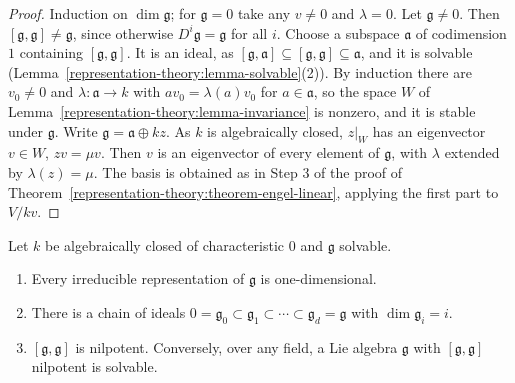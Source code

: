\begin{proof}
Induction on $\dim\mathfrak{g}$; for $\mathfrak{g} = 0$ take any $v \neq 0$ and $\lambda = 0$. Let $\mathfrak{g} \neq 0$. Then $[\mathfrak{g}, \mathfrak{g}] \neq \mathfrak{g}$,
since otherwise $D^i\mathfrak{g} = \mathfrak{g}$ for all $i$. Choose a subspace $\mathfrak{a}$ of codimension $1$ containing $[\mathfrak{g}, \mathfrak{g}]$. It is an ideal,
as $[\mathfrak{g}, \mathfrak{a}] \subseteq [\mathfrak{g}, \mathfrak{g}] \subseteq \mathfrak{a}$, and it is solvable (Lemma~\ref{representation-theory:lemma-solvable}(2)). By
induction there are $v_0 \neq 0$ and $\lambda \colon \mathfrak{a} \to k$ with $av_0 = \lambda(a)v_0$ for $a \in \mathfrak{a}$, so the space $W$ of
Lemma~\ref{representation-theory:lemma-invariance} is nonzero, and it is stable under $\mathfrak{g}$. Write $\mathfrak{g} = \mathfrak{a} \oplus kz$. As $k$ is algebraically
closed, $z|_W$ has an eigenvector $v \in W$, $zv = \mu v$. Then $v$ is an eigenvector of every element of $\mathfrak{g}$, with $\lambda$ extended by $\lambda(z) = \mu$.
The basis is obtained as in Step 3 of the proof of Theorem~\ref{representation-theory:theorem-engel-linear}, applying the first part to $V/kv$.
\end{proof}

\begin{corollary}\label{representation-theory:corollary-lie}
Let $k$ be algebraically closed of characteristic $0$ and $\mathfrak{g}$ solvable.
\begin{enumerate}
\item Every irreducible representation of $\mathfrak{g}$ is one-dimensional.
\item There is a chain of ideals $0 = \mathfrak{g}_0 \subset \mathfrak{g}_1 \subset \cdots \subset \mathfrak{g}_d = \mathfrak{g}$ with $\dim\mathfrak{g}_i = i$.
\item $[\mathfrak{g}, \mathfrak{g}]$ is nilpotent. Conversely, over any field, a Lie algebra $\mathfrak{g}$ with $[\mathfrak{g}, \mathfrak{g}]$ nilpotent is solvable.
\end{enumerate}
\end{corollary}

